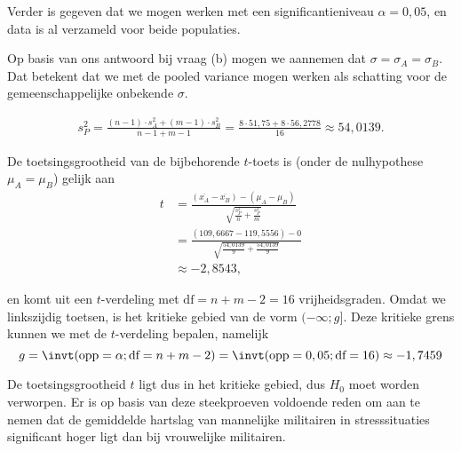 \begin{enumerate}[label=(\alph*)]
{            Verder is gegeven dat we mogen werken met een significantieniveau $\alpha=0,05$, en data is al verzameld voor beide populaties.

            Op basis van ons antwoord bij vraag (b) mogen we aannemen dat $\sigma = \sigma_A = \sigma_B$.
            Dat betekent dat we met de pooled variance mogen werken als schatting voor de gemeenschappelijke onbekende $\sigma$.
            
            \begin{align*}
                s_P^2 = \frac{(n-1)\cdot s_A^2 + (m-1) \cdot s_B^2}{n-1+m-1} = \frac{8 \cdot 51,75 + 8 \cdot 56,2778}{16} \approx 54,0139.
            \end{align*}
            
            De toetsingsgrootheid van de bijbehorende $t$-toets is (onder de nulhypothese $\mu_A = \mu_B$) gelijk aan
            \begin{align*}
                t &= \frac{(\overline{x_A}-\overline{x_B}) - (\mu_A - \mu_B)}{\sqrt{\frac{s_P^2}{n} + \frac{s_P^2}{m}}} \\
                  &= \frac{(109,6667 - 119,5556) - 0}{\sqrt{\frac{54,0139}{9} + \frac{54,0139}{9}}} \\
                  &\approx -2,8543, 
            \end{align*}

            en komt uit een $t$-verdeling met $\text{df}=n+m-2=16$ vrijheidsgraden.
            Omdat we linkszijdig toetsen, is het kritieke gebied van de vorm $(-\infty; g]$.
            Deze kritieke grens kunnen we met de $t$-verdeling bepalen, namelijk
            \[
                g = \invt(\text{opp} = \alpha; \text{df}=n+m-2) = \invt(\text{opp}=0,05; \text{df}=16) \approx -1,7459
            \]
            
            De toetsingsgrootheid $t$ ligt dus in het kritieke gebied, dus $H_0$ moet worden verworpen.
            Er is op basis van deze steekproeven voldoende reden om aan te nemen dat de gemiddelde hartslag van mannelijke militairen in stresssituaties significant hoger ligt dan bij vrouwelijke militairen.
            \begin{center}
            \end{center}
        }    
    
    \end{enumerate}